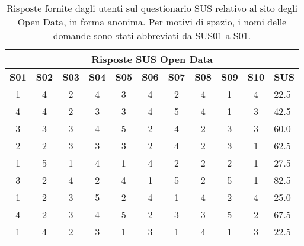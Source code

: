 \begin{center}
    \begin{table}
        \centering
        \begin{tabularx}{\textwidth}{|c|c|c|c|c|c|c|c|c|c|X|}
            \hline
            \multicolumn{11}{|c|}{\textbf{Risposte SUS Open Data}} \\
            \hline
            \textbf{S01} & \textbf{S02} & \textbf{S03} & \textbf{S04} & \textbf{S05} & \textbf{S06} & \textbf{S07} & \textbf{S08} & \textbf{S09} & \textbf{S10} & \textbf{SUS} \\
            \hline
            1 & 4 & 2 & 4 & 3 & 4 & 2 & 4 & 1 & 4 & 22.5 \\
            4 & 4 & 2 & 3 & 3 & 4 & 5 & 4 & 1 & 3 & 42.5 \\
            3 & 3 & 3 & 4 & 5 & 2 & 4 & 2 & 3 & 3 & 60.0 \\
            2 & 2 & 3 & 3 & 3 & 2 & 4 & 2 & 3 & 1 & 62.5 \\
            1 & 5 & 1 & 4 & 1 & 4 & 2 & 2 & 2 & 1 & 27.5 \\
            3 & 2 & 4 & 2 & 4 & 1 & 5 & 2 & 5 & 1 & 82.5 \\
            1 & 2 & 3 & 5 & 2 & 4 & 1 & 4 & 2 & 4 & 25.0 \\
            4 & 2 & 3 & 4 & 5 & 2 & 3 & 3 & 5 & 2 & 67.5 \\
            1 & 4 & 2 & 3 & 1 & 3 & 1 & 4 & 1 & 3 & 22.5 \\
            \hline
        \end{tabularx}
        \caption[Risposte del questionario SUS sul sito degli Open Data]{Risposte fornite dagli utenti sul questionario SUS relativo al sito degli Open Data, in forma anonima. Per motivi di spazio, i nomi delle domande sono stati abbreviati da SUS01 a S01.}
        \label{tab:sus_opendata}
    \end{table}
\end{center}

